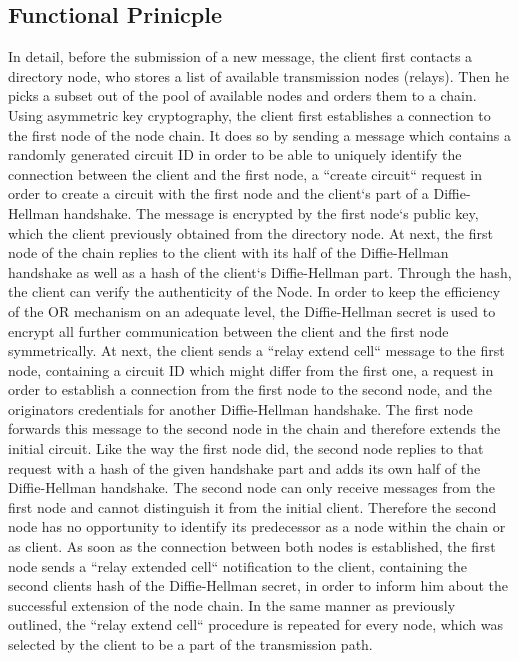 \documentclass{sig-alternate}
\begin{document}
\subsection{Functional Prinicple}
In detail, before the submission of a new message, the client first contacts a directory node, who stores a list of available transmission nodes (relays).  Then he picks a subset out of the pool of available nodes and orders them to a chain. Using asymmetric key cryptography, the client first establishes a connection to the first node of the node chain. It does so by sending a message which contains a randomly generated circuit ID in order to be able to uniquely identify the connection between the client and the first node, a ``create circuit`` request in order to create a circuit with the first node and the client`s part of a Diffie-Hellman handshake. The message is encrypted by the first node`s public key, which the client previously obtained from the directory node. At next, the first node of the chain replies to the client with its half of the Diffie-Hellman handshake\cite{diffie1976new} as well as a hash of the client`s Diffie-Hellman part. Through the hash, the client can verify the authenticity of the Node. In order to keep the efficiency of the OR mechanism on an adequate level, the Diffie-Hellman secret is used to encrypt all further communication between the client and the first node symmetrically. At next, the client sends a ``relay extend cell`` message to the first node, containing a circuit ID which might differ from the first one, a request in order to establish a connection from the first node to the second node, and the originators credentials for another Diffie-Hellman handshake. The first node forwards this message to the second node in the chain and therefore extends the initial circuit. Like the way the first node did, the second node replies to that request with a hash of the given handshake part and adds its own half of the Diffie-Hellman handshake. The second node can only receive messages from the first node and cannot distinguish it from the initial client. Therefore the second node has no opportunity to identify its predecessor as a node within the chain or as client. As soon as the connection between both nodes is established, the first node sends a ``relay extended cell`` notification to the client, containing the second clients hash of the Diffie-Hellman secret, in order to inform him about the successful extension of the node chain. In the same manner as previously outlined, the ``relay extend cell`` procedure is repeated for every node, which was selected by the client to be a part of the transmission path. 
\end{document}
